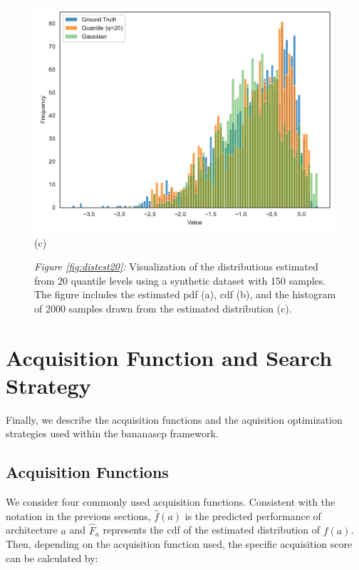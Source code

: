 \begin{landscape}
\begin{figure}[H]
  \hfill
   \begin{minipage}[b]{0.4\textwidth}
    \centering
    \includegraphics[width=\linewidth]{figs/20_rvs_plot.pdf}
    \\[0.5em]
    {\small (c)}
  \end{minipage}
  \vspace{1em}
  
 \parbox{\linewidth}{
 	 {\small \textit{Figure \ref{fig:distest20}:} Visualization of the distributions estimated from 20 quantile levels using a synthetic dataset with 150 samples. The figure includes the estimated \gls{pdf} (a), \gls{cdf} (b), and the histogram of 2000 samples drawn from the estimated distribution (c).}
 }
\end{figure}
\end{landscape}

\vspace{1em}
\section{Acquisition Function and Search Strategy}
\label{sec:acq}
Finally, we describe the acquisition functions and the aquisition optimization strategies used within the \gls{bananascp} framework.

\subsection{Acquisition Functions}
We consider four commonly used acquisition functions. Consistent with the notation in the previous sections, $\hat{f}(a)$ is the predicted performance of architecture $a$ and $\hat{F}_a$ represents the \gls{cdf} of the estimated distribution of $f(a)$. Then, depending on the acquisition function used, the specific acquisition score can be calculated by: 

